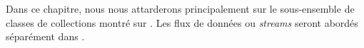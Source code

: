 \documentclass[a4paper,10pt,twoside]{book}
\begin{document}



Dans ce chapitre, nous nous attarderons principalement sur le sous-ensemble
de classes de collections montr\'e sur 
.
Les flux de donn\'ees ou \emph{streams} seront abord\'es séparément dans 
.


\end{document}
